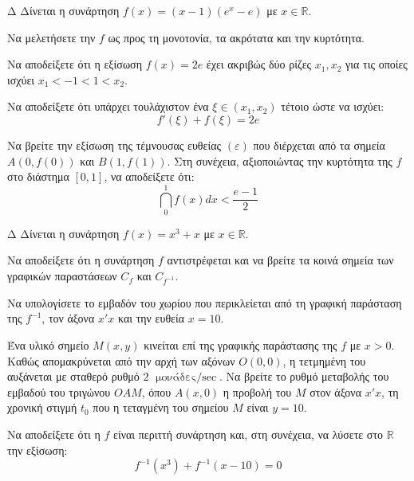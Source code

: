 \begin{thema}{Δ}
Δίνεται η συνάρτηση $f(x) = (x-1)(e^x - e)$ με $x \in \mathbb{R}$.
\begin{erwthma}
    \item Να μελετήσετε την $f$ ως προς τη μονοτονία, τα ακρότατα και την κυρτότητα.
    \item Να αποδείξετε ότι η εξίσωση $f(x) = 2e$ έχει ακριβώς δύο ρίζες $x_1, x_2$ για τις οποίες ισχύει $x_1 < -1 < 1 < x_2$.
    \item Να αποδείξετε ότι υπάρχει τουλάχιστον ένα $\xi \in (x_1, x_2)$ τέτοιο ώστε να ισχύει: 
    \[ f'(\xi) + f(\xi) = 2e \]
    \item Να βρείτε την εξίσωση της τέμνουσας ευθείας $(\varepsilon)$ που διέρχεται από τα σημεία $A(0, f(0))$ και $B(1, f(1))$. Στη συνέχεια, αξιοποιώντας την κυρτότητα της $f$ στο διάστημα $[0, 1]$, να αποδείξετε ότι:
    \[ \dint_0^1 f(x) dx < \frac{e-1}{2} \]
\end{erwthma}
\end{thema}

\begin{thema}{Δ}
Δίνεται η συνάρτηση $f(x) = x^3 + x$ με $x \in \mathbb{R}$.
\begin{erwthma}
    \item Να αποδείξετε ότι η συνάρτηση $f$ αντιστρέφεται και να βρείτε τα κοινά σημεία των γραφικών παραστάσεων $C_f$ και $C_{f^{-1}}$.
    \item Να υπολογίσετε το εμβαδόν του χωρίου που περικλείεται από τη γραφική παράσταση της $f^{-1}$, τον άξονα $x'x$ και την ευθεία $x = 10$.
    \item Ένα υλικό σημείο $M(x, y)$ κινείται επί της γραφικής παράστασης της $f$ με $x > 0$. Καθώς απομακρύνεται από την αρχή των αξόνων $O(0,0)$, η τετμημένη του αυξάνεται με σταθερό ρυθμό $2 \text{ μονάδες/$\sec$}$. Να βρείτε το ρυθμό μεταβολής του εμβαδού του τριγώνου $OAM$, όπου $A(x, 0)$ η προβολή του $M$ στον άξονα $x'x$, τη χρονική στιγμή $t_0$ που η τεταγμένη του σημείου $M$ είναι $y = 10$.
    \item Να αποδείξετε ότι η $f$ είναι περιττή συνάρτηση και, στη συνέχεια, να λύσετε στο $\mathbb{R}$ την εξίσωση:
    \[ f^{-1}(x^3) + f^{-1}(x - 10) = 0 \]
\end{erwthma}
\end{thema}


